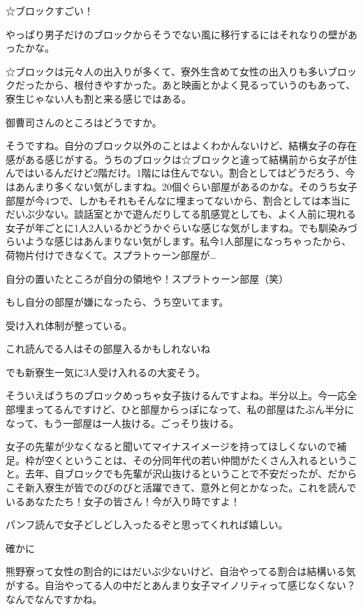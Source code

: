 \begin{multicols}{2}
  ☆ブロックすごい！

  やっぱり男子だけのブロックからそうでない風に移行するにはそれなりの壁があったかな。

  ☆ブロックは元々人の出入りが多くて、寮外生含めて女性の出入りも多いブロックだったから、根付きやすかった。あと映画とかよく見るっていうのもあって、寮生じゃない人も割と来る感じではある。

  御曹司さんのところはどうですか。

  そうですね。自分のブロック以外のことはよくわかんないけど、結構女子の存在感がある感じがする。うちのブロックは☆ブロックと違って結構前から女子が住んではいるんだけど2階だけ。1階には住んでない。割合としてはどうだろう、今はあんまり多くない気がしますね。20個ぐらい部屋があるのかな。そのうち女子部屋が今4つで、しかもそれもそんなに埋まってないから、割合としては本当にだいぶ少ない。談話室とかで遊んだりしてる肌感覚としても、よく人前に現れる女子が年ごとに1人2人いるかどうかぐらいな感じな気がしますね。でも馴染みづらいような感じはあんまりない気がします。私今1人部屋になっちゃったから、荷物片付けできなくて。スプラトゥーン部屋が…

  自分の置いたところが自分の領地や！スプラトゥーン部屋（笑）

  もし自分の部屋が嫌になったら、うち空いてます。

  受け入れ体制が整っている。

  これ読んでる人はその部屋入るかもしれないね

  でも新寮生一気に3人受け入れるの大変そう。

  そういえばうちのブロックめっちゃ女子抜けるんですよね。半分以上。今一応全部埋まってるんですけど、ひと部屋からっぽになって、私の部屋はたぶん半分になって、もう一部屋は一人抜ける。ごっそり抜ける。

  女子の先輩が少なくなると聞いてマイナスイメージを持ってほしくないので補足。枠が空くということは、その分同年代の若い仲間がたくさん入れるということ。去年、自ブロックでも先輩が沢山抜けるということで不安だったが、だからこそ新入寮生が皆でのびのびと活躍できて、意外と何とかなった。これを読んでいるあなたたち！女子の皆さん！今が入り時ですよ！

  パンフ読んで女子どしどし入ったるぞと思ってくれれば嬉しい。

  確かに

  熊野寮って女性の割合的にはだいぶ少ないけど、自治やってる割合は結構いる気がする。自治やってる人の中だとあんまり女子マイノリティって感じなくない？なんでなんですかね。


\end{multicols}
